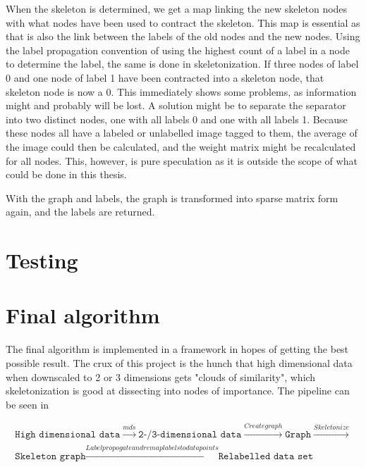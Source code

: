 \documentclass[10pt, letterpaper]{article}
\begin{document}
When the skeleton is determined, we get a map linking the new skeleton nodes with what nodes have been used to contract the skeleton. This map is essential as that is also the link between the labels of the old nodes and the new nodes. Using the label propagation convention of using the highest count of a label in a node to determine the label, the same is done in skeletonization. If three nodes of label 0 and one node of label 1 have been contracted into a skeleton node, that skeleton node is now a 0. This immediately shows some problems, as information might and probably will be lost. A solution might be to separate the separator into two distinct nodes, one with all labels 0 and one with all labels 1. Because these nodes all have a labeled or unlabelled image tagged to them, the average of the image could then be calculated, and the weight matrix might be recalculated for all nodes. This, however, is pure speculation as it is outside the scope of what could be done in this thesis.

With the graph and labels, the graph is transformed into sparse matrix form again, and the labels are returned.

\section{Testing} \label{sec:imptest}

\section{Final algorithm}
The final algorithm is implemented in a framework in hopes of getting the best possible result. The crux of this project is the hunch that high dimensional data when downscaled to 2 or 3 dimensions gets "clouds of similarity", which skeletonization is good at dissecting into nodes of importance. The pipeline can be seen in 

\begin{align*}\label{eq:imppipe}
    \texttt{High dimensional data} \xrightarrow{mds} \texttt{2-/3-dimensional data} \xrightarrow{Create graph} \texttt{Graph} \xrightarrow{Skeletonize}\\ \texttt{Skeleton graph} \xrightarrow{Label propogate and remap labels to data points} \texttt{Relabelled data set}
\end{align*}
\end{document}

